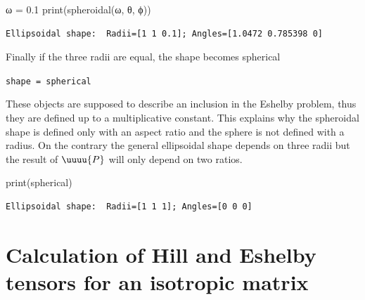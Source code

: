 \documentclass[
  letterpaper,
  DIV=11,
  numbers=noendperiod]{scrreprt}
\newenvironment{Shaded}{\begin{snugshade}}{\end{snugshade}}
\newcommand{\BuiltInTok}[1]{\textcolor[rgb]{0.00,0.23,0.31}{#1}}
\newcommand{\FloatTok}[1]{\textcolor[rgb]{0.68,0.00,0.00}{#1}}
\newcommand{\NormalTok}[1]{\textcolor[rgb]{0.00,0.23,0.31}{#1}}
\newcommand{\OperatorTok}[1]{\textcolor[rgb]{0.37,0.37,0.37}{#1}}
\begin{document}
\begin{Shaded}
\begin{Highlighting}[]
\NormalTok{ω }\OperatorTok{=} \FloatTok{0.1}
\BuiltInTok{print}\NormalTok{(spheroidal(ω, θ, ϕ))}
\end{Highlighting}
\end{Shaded}

\begin{verbatim}
Ellipsoidal shape:  Radii=[1 1 0.1]; Angles=[1.0472 0.785398 0]
\end{verbatim}

Finally if the three radii are equal, the shape becomes spherical

\texttt{shape\ =\ spherical}

\begin{tcolorbox}[enhanced jigsaw, left=2mm, bottomrule=.15mm, colbacktitle=quarto-callout-warning-color!10!white, colback=white, colframe=quarto-callout-warning-color-frame, rightrule=.15mm, bottomtitle=1mm, toptitle=1mm, titlerule=0mm, title=\textcolor{quarto-callout-warning-color}{\faExclamationTriangle}\hspace{0.5em}{Warning}, toprule=.15mm, arc=.35mm, opacityback=0, opacitybacktitle=0.6, leftrule=.75mm, breakable, coltitle=black]

These objects are supposed to describe an inclusion in the Eshelby
problem, thus they are defined up to a multiplicative constant. This
explains why the spheroidal shape is defined only with an aspect ratio
and the sphere is not defined with a radius. On the contrary the general
ellipsoidal shape depends on three radii but the result of \(\uuuu{P}\)
will only depend on two ratios.

\end{tcolorbox}

\begin{Shaded}
\begin{Highlighting}[]
\BuiltInTok{print}\NormalTok{(spherical)}
\end{Highlighting}
\end{Shaded}

\begin{verbatim}
Ellipsoidal shape:  Radii=[1 1 1]; Angles=[0 0 0]
\end{verbatim}

\section{Calculation of Hill and Eshelby tensors for an isotropic
matrix}\label{calculation-of-hill-and-eshelby-tensors-for-an-isotropic-matrix}
\end{document}

